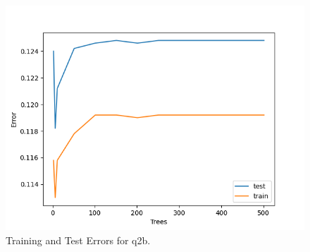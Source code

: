 \documentclass[12pt, fullpage,letterpaper]{article}
\begin{document}
\begin{enumerate}
\begin{enumerate}
	\begin{figure}[htp]
        \centering
        \includegraphics[width=12cm]{q2b_plot.png}
        \caption{Training and Test Errors for q2b.}
        \label{fig:q4a}
    \end{figure}


\end{enumerate}
\end{enumerate}
\end{document}
